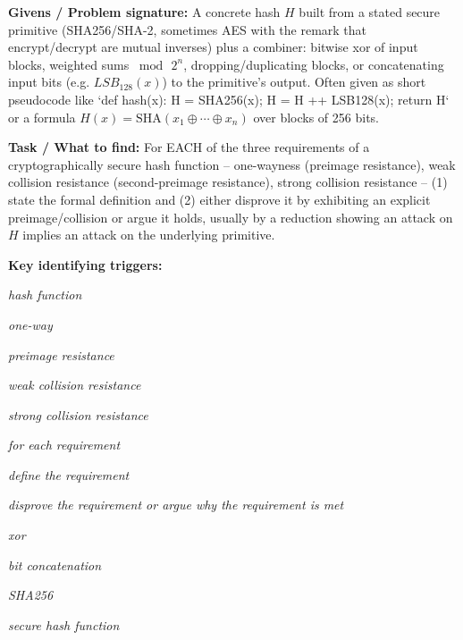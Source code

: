 \documentclass[12pt, a4paper]{article}
\begin{document}
\textbf{Givens / Problem signature:}
A concrete hash $H$ built from a stated secure primitive (SHA256/SHA-2, sometimes AES with the remark that encrypt/decrypt are mutual inverses) plus a combiner: bitwise xor of input blocks, weighted sums $\bmod\, 2^n$, dropping/duplicating blocks, or concatenating input bits (e.g. $LSB_{128}(x)$) to the primitive's output.
Often given as short pseudocode like `def hash(x): H = SHA256(x); H = H ++ LSB128(x); return H` or a formula $H(x) = \mathrm{SHA}(x_1 \oplus \cdots \oplus x_n)$ over blocks of 256 bits.

\textbf{Task / What to find:}
For EACH of the three requirements of a cryptographically secure hash function -- one-wayness (preimage resistance), weak collision resistance (second-preimage resistance), strong collision resistance -- (1) state the formal definition and (2) either disprove it by exhibiting an explicit preimage/collision or argue it holds, usually by a reduction showing an attack on $H$ implies an attack on the underlying primitive.

\textbf{Key identifying triggers:}
\begin{tightitem}
        \item \textit{hash function}
        \item \textit{one-way}
        \item \textit{preimage resistance}
        \item \textit{weak collision resistance}
        \item \textit{strong collision resistance}
        \item \textit{for each requirement}
        \item \textit{define the requirement}
        \item \textit{disprove the requirement or argue why the requirement is met}
        \item \textit{xor}
        \item \textit{bit concatenation}
        \item \textit{SHA256}
        \item \textit{secure hash function}
    \end{tightitem}
\end{document}
